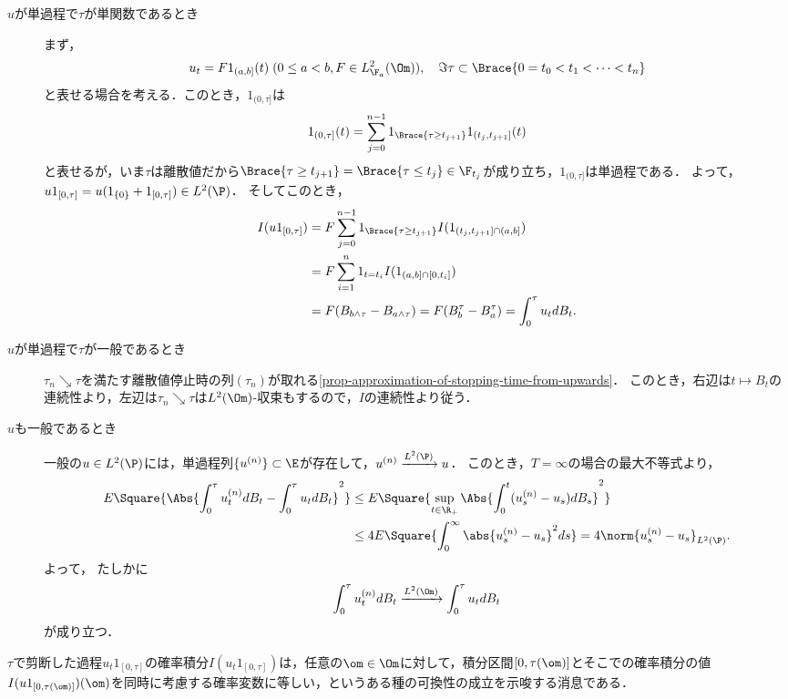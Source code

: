 \documentclass[uplatex,dvipdfmx]{jsreport}
\begin{document}
\begin{Proof}\mbox{}
    \begin{description}
        \item[$u$が単過程で$\tau$が単関数であるとき] 
        まず，
        \[u_t=F1_{(a,b]}(t)\;(0\le a<b,F\in L^2_{\F_a}(\Om)),\quad\Im\tau\subset\Brace{0=t_0<t_1<\cdots<t_n}\]
        と表せる場合を考える．このとき，$1_{(0,\tau]}$は
        \[1_{(0,\tau]}(t)=\sum^{n-1}_{j=0}1_{\Brace{\tau\ge t_{j+1}}}1_{(t_j,t_{j+1}]}(t)\]
        と表せるが，いま$\tau$は離散値だから$\Brace{\tau\ge t_{j+1}}=\Brace{\tau\le t_j}\in\F_{t_j}$が成り立ち，$1_{(0,\tau]}$は単過程である．
        よって，$u1_{[0,\tau]}=u(1_{\{0\}}+1_{[0,\tau]})\in L^2(\P)$．
        そしてこのとき，
        \begin{align*}
            I(u1_{[0,\tau]})&=F\sum^{n-1}_{j=0}1_{\Brace{\tau\ge t_{j+1}}}I(1_{(t_j,t_{j+1}]\cap(a,b]})\\
            &=F\sum^n_{i=1}1_{t=t_i}I(1_{(a,b]\cap[0,t_i]})\\
            &=F(B_{b\land\tau}-B_{a\land\tau})=F(B^\tau_b-B^\tau_a)=\int^\tau_0u_tdB_t.
        \end{align*}
        \item[$u$が単過程で$\tau$が一般であるとき] 
        $\tau_n\searrow\tau$を満たす離散値停止時の列$(\tau_n)$が取れる\ref{prop-approximation-of-stopping-time-from-upwards}．
        このとき，右辺は$t\mapsto B_t$の連続性より，左辺は$\tau_n\searrow\tau$は$L^2(\Om)$-収束もするので，$I$の連続性より従う．
        \item[$u$も一般であるとき] 
        一般の$u\in L^2(\P)$には，単過程列$\{u^{(n)}\}\subset\E$が存在して，$u^{(n)}\xrightarrow{L^2(\P)}u$．
        このとき，$T=\infty$の場合の最大不等式より，
        \begin{align*}
            E\Square{\Abs{\int^\tau_0u_t^{(n)}dB_t-\int^\tau_0u_tdB_t}^2}&\le E\Square{\sup_{t\in\R_+}\Abs{\int^t_0(u_s^{(n)}-u_s)dB_s}^2}\\
            &\le 4E\Square{\int^\infty_0\abs{u_s^{(n)}-u_s}^2ds}=4\norm{u_s^{(n)}-u_s}_{L^2(\P)}.
        \end{align*}
        よって，
        たしかに
        \[\int^\tau_0u_t^{(n)}dB_t\xrightarrow{L^2(\Om)}\int^\tau_0u_tdB_t\]
        が成り立つ．
    \end{description}
\end{Proof}
\begin{remarks}
    $\tau$で剪断した過程$u_t1_{[0,\tau]}$の確率積分$I(u_t1_{[0,\tau]})$は，任意の$\om\in\Om$に対して，積分区間$[0,\tau(\om)]$とそこでの確率積分の値$I(u1_{[0,\tau(\om)]})(\om)$を同時に考慮する確率変数に等しい，というある種の可換性の成立を示唆する消息である．
\end{remarks}
\end{document}
